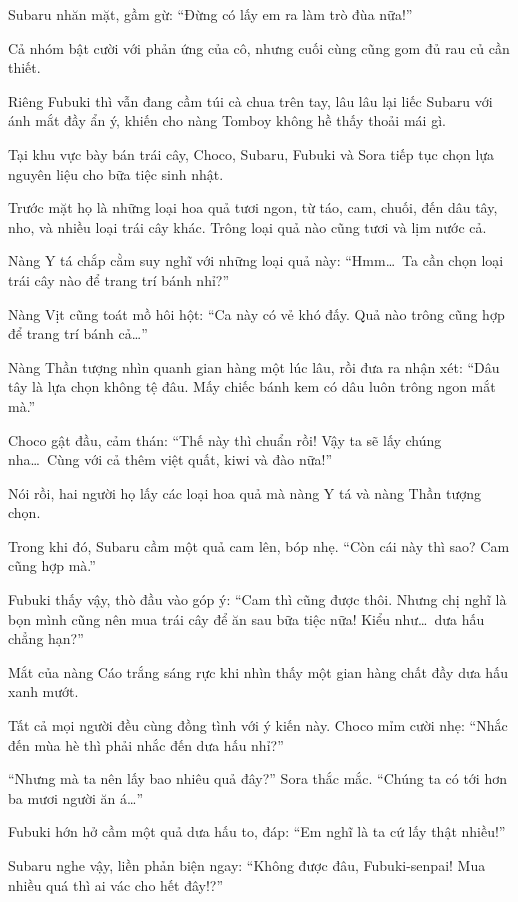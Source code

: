\documentclass[../main.tex]{subfiles}
\begin{document}
Subaru nhăn mặt, gầm gừ: ``Đừng có lấy em ra làm trò đùa nữa!''

Cả nhóm bật cười với phản ứng của cô, nhưng cuối cùng cũng gom đủ rau củ cần thiết.

Riêng Fubuki thì vẫn đang cầm túi cà chua trên tay, lâu lâu lại liếc Subaru với ánh mắt đầy ẩn ý, khiến cho nàng Tomboy không hề thấy thoải mái gì.

\ct

Tại khu vực bày bán trái cây, Choco, Subaru, Fubuki và Sora tiếp tục chọn lựa nguyên liệu cho bữa tiệc sinh nhật.

Trước mặt họ là những loại hoa quả tươi ngon, từ táo, cam, chuối, đến dâu tây, nho, và nhiều loại trái cây khác. Trông loại quả nào cũng tươi và lịm nước cả.

Nàng Y tá chắp cằm suy nghĩ với những loại quả này: ``Hmm\dots\ Ta cần chọn loại trái cây nào để trang trí bánh nhỉ?''

Nàng Vịt cũng toát mồ hôi hột: ``Ca này có vẻ khó đấy. Quả nào trông cũng hợp để trang trí bánh cả\dots''

Nàng Thần tượng nhìn quanh gian hàng một lúc lâu, rồi đưa ra nhận xét: ``Dâu tây là lựa chọn không tệ đâu. Mấy chiếc bánh kem có dâu luôn trông ngon mắt mà.''

Choco gật đầu, cảm thán: ``Thế này thì chuẩn rồi! Vậy ta sẽ lấy chúng nha\dots\ Cùng với cả thêm việt quất, kiwi và đào nữa!''

Nói rồi, hai người họ lấy các loại hoa quả mà nàng Y tá và nàng Thần tượng chọn.

Trong khi đó, Subaru cầm một quả cam lên, bóp nhẹ. ``Còn cái này thì sao? Cam cũng hợp mà.''

Fubuki thấy vậy, thò đầu vào góp ý: ``Cam thì cũng được thôi. Nhưng chị nghĩ là bọn mình cũng nên mua trái cây để ăn sau bữa tiệc nữa! Kiểu như\dots\ dưa hấu chẳng hạn?''

Mắt của nàng Cáo trắng sáng rực khi nhìn thấy một gian hàng chất đầy dưa hấu xanh mướt.

Tất cả mọi người đều cùng đồng tình với ý kiến này. Choco mỉm cười nhẹ: ``Nhắc đến mùa hè thì phải nhắc đến dưa hấu nhỉ?''

``Nhưng mà ta nên lấy bao nhiêu quả đây?'' Sora thắc mắc. ``Chúng ta có tới hơn ba mươi người ăn á\dots''

Fubuki hớn hở cầm một quả dưa hấu to, đáp: ``Em nghĩ là ta cứ lấy thật nhiều!''

Subaru nghe vậy, liền phản biện ngay: ``Không được đâu, Fubuki-senpai! Mua nhiều quá thì ai vác cho hết đây!?''
\end{document}
